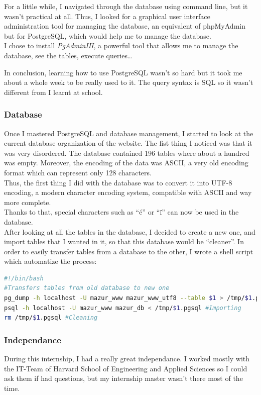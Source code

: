 \documentclass[10pt,a4paper]{article}
\newcommand{\hseas}{Harvard School of Engineering and Applied Sciences}
\begin{document}
For a little while, I navigated through the database using command line, but it wasn't practical at all. Thus, I looked for a graphical user interface administration tool for managing the database, an equivalent of phpMyAdmin but for PostgreSQL, which would help me to manage the database.\\
I chose to install \textit{PgAdminIII}, a powerful tool that allows me to manage the database, see the tables, execute queries\ldots

In conclusion, learning how to use PostgreSQL wasn't so hard but it took me about a whole week to be really used to it. The query syntax is SQL so it wasn't different from I learnt at school.

\subsubsection*{Database}
Once I mastered PostgreSQL and database management, I started to look at the current database organization of the website. The fist thing I noticed was that it was very disordered. The database contained 196 tables where about a hundred was empty. Moreover, the encoding of the data was ASCII, a very old encoding format which can represent only 128 characters.\\
Thus, the first thing I did with the database was to convert it into UTF-8 encoding, a modern character encoding system, compatible with ASCII and way more complete.\\ Thanks to that, special characters such as ``é'' or ``ï'' can now be used in the database.\\

After looking at all the tables in the database, I decided to create a new one, and import tables that I wanted in it, so that this database would be ``cleaner''. In order to easily transfer tables from a database to the other, I wrote a shell script which automatize the process:\\

\begin{lstlisting}[language=bash]
#!/bin/bash
#Transfers tables from old database to new one
pg_dump -h localhost -U mazur_www mazur_www_utf8 --table $1 > /tmp/$1.pgsql #Exporting
psql -h localhost -U mazur_www mazur_db < /tmp/$1.pgsql #Importing
rm /tmp/$1.pgsql #Cleaning
\end{lstlisting}


\subsubsection*{Independance}
During this internship, I had a really great independance. I worked mostly with the IT-Team of \hseas{} so I could ask them if had questions, but my internship master wasn't there most of the time.
\end{document}

